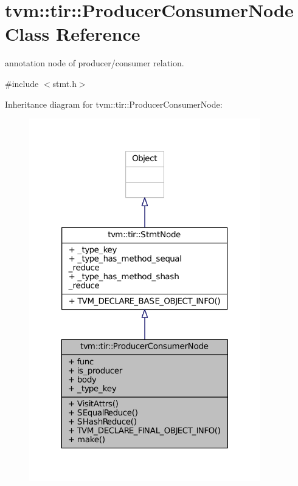 \hypertarget{classtvm_1_1tir_1_1ProducerConsumerNode}{}\section{tvm\+:\+:tir\+:\+:Producer\+Consumer\+Node Class Reference}
\label{classtvm_1_1tir_1_1ProducerConsumerNode}


annotation node of producer/consumer relation.  




{\ttfamily \#include $<$stmt.\+h$>$}



Inheritance diagram for tvm\+:\+:tir\+:\+:Producer\+Consumer\+Node\+:
\nopagebreak
\begin{figure}[H]
\begin{center}
\leavevmode
\includegraphics[width=285pt]{classtvm_1_1tir_1_1ProducerConsumerNode__inherit__graph}
\end{center}
\end{figure}



